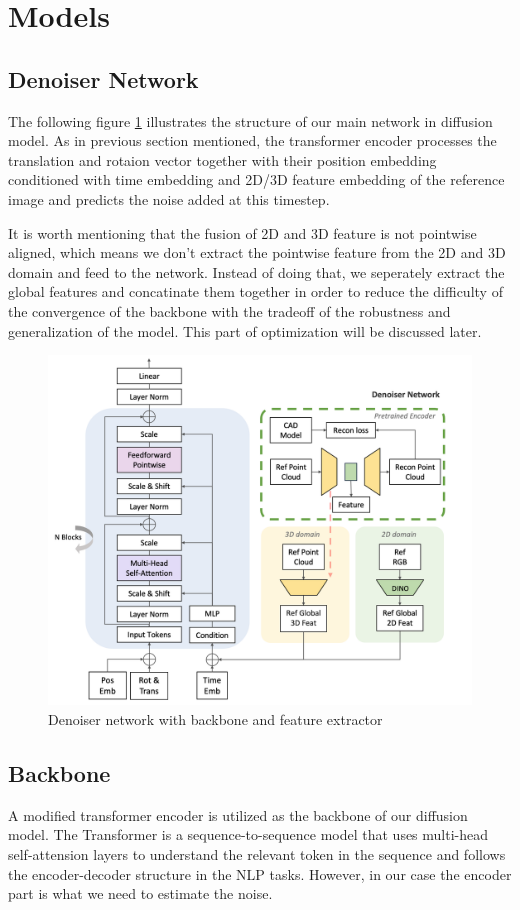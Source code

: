 \documentclass[12pt,DIV14,BCOR12mm,a4paper,footinclude=false,headinclude,parskip=half-,twoside,openright,cleardoublepage=empty,toc=index,bibliography=totoc,listof=totoc]{scrreprt}
\numberwithin{equation}{chapter}
\begin{document}
\section{Models}
\subsection{Denoiser Network}
The following figure \ref{img:denoiser} illustrates the structure of our main network in diffusion model. As in previous section mentioned, the transformer encoder processes the translation and rotaion vector together with their position embedding conditioned with time embedding and 2D/3D feature embedding of the reference image and predicts the noise added at this timestep. 

It is worth mentioning that the fusion of 2D and 3D feature is not pointwise aligned, which means we don't extract the pointwise feature from the 2D and 3D domain and feed to the network. Instead of doing that, we seperately extract the global features and concatinate them together in order to reduce the difficulty of the convergence of the backbone with the tradeoff of the robustness and generalization of the model. This part of optimization will be discussed later.
\begin{figure}[h]
	\centering
	\includegraphics[scale=.30]{img/denoiser.png}
	\caption{Denoiser network with backbone and feature extractor}
	\label{img:denoiser}
\end{figure}

\subsection{Backbone}
A modified transformer encoder is utilized as the backbone of our diffusion model. The Transformer\cite{vaswani2023attention} is a sequence-to-sequence model that uses multi-head self-attension layers to understand the relevant token in the sequence and follows the encoder-decoder structure in the NLP tasks. However, in our case the encoder part is what we need to estimate the noise.
\end{document}
